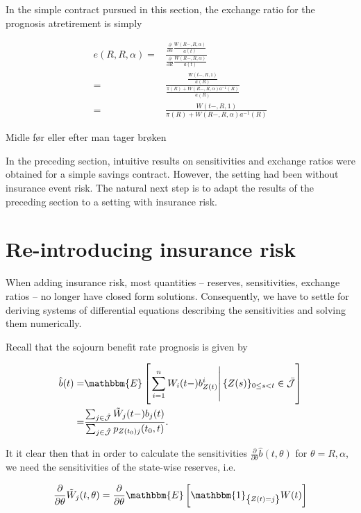 \documentclass{book}
\newcommand{\1}[1]{\mathbbm{1}_{\left\lbrace #1 \right\rbrace}}
\newcommand{\expec}[1][def]{\mathbbm{E} \left[ #1 \right]}
\newcommand{\econd}[2][def]{\mathbbm{E} \left[ \left. #1 \right| #2 \right]}
\theoremstyle{break}
\theoremstyle{remark}
\newenvironment{remark}
  {\pushQED{\qed}\renewcommand{\qedsymbol}{\scalebox{1.4}{$\circ$}}\remarkx}
  {\popQED\endremarkx}
\numberwithin{equation}{section}
\begin{document}
In the simple contract pursued in this section, the exchange ratio for the prognosis atretirement is simply

\begin{align*}
	e(R,R,\alpha) =& \frac{\frac{\partial}{\partial \alpha }\frac{W(R-,R,\alpha)}{a(t)}}{\frac{\partial}{\partial R }\frac{W(R-,R,\alpha)}{a(t)}} \\
	=& \frac{\frac{W(t-,R,1)}{a(R)}}{\frac{\pi (R) + W(R-,R,\alpha) a^{-1}(R)}{a(R)}} \\
	=& \frac{W(t-,R,1)}{\pi (R) + W(R-,R,\alpha) a^{-1}(R)}
\end{align*}   

\begin{remark}
	Midle før eller efter man tager brøken
\end{remark}

In the preceding section, intuitive results on sensitivities and exchange ratios were obtained for a simple savings contract. However, the setting had been without insurance event risk. The natural next step is to adapt the results of the preceding section to a setting with insurance risk.

\section{Re-introducing insurance risk}

When adding insurance risk, most quantities -- reserves, sensitivities, exchange ratios -- no longer have closed form solutions. Consequently, we have to settle for deriving systems of differential equations describing the sensitivities and solving them numerically.

Recall that the sojourn benefit rate prognosis is given by

\begin{align*}
	\hat{b}(t)=& \econd[\sum_{i=1}^n W_i(t-)b_{Z(t)}^i]{\{Z(s) \}_{0 \leq s < t} \in \bar{\mathcal{J}}} \\
	=& \frac{\sum_{j \in \hat{\mathcal{J}}} \tilde{W}_j(t-) b_j(t)}{\sum_{j \in \hat{\mathcal{J}}} p_{Z(t_0)j}(t_0,t)}.
\end{align*}

It it clear then that in order to calculate the sensitivities $\frac{\partial}{\partial \theta} \hat{b}(t,\theta)$ for $\theta=R,\alpha$, we need the sensitivities of the state-wise reserves, i.e.

\begin{align*}
	\frac{\partial}{\partial \theta} \tilde{W}_j(t,\theta) = \frac{\partial}{\partial \theta} \expec[\1{Z(t)=j} W(t)]
\end{align*}
\end{document}
